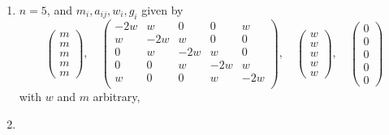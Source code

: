 \begin{lemma}
\begin{enumerate}
$$\begin{matrix}
m \\
m \\
2m
\end{matrix}
\right),
\quad
\left(
\begin{matrix}
-4w & 2w & 2w & 2w \\
2w & -4w & 0 & 0 \\
2w & 0 & -4w & 0 \\
2w & 0 & 0 & -2w
\end{matrix}
\right),
\quad
\left(
\begin{matrix}
2w \\
2w \\
2w \\
w
\end{matrix}
\right),
\quad
\left(
\begin{matrix}
0 \\
0 \\
0 \\
0
\end{matrix}
\right)
$$
with $w$ and $m$ arbitrary,
\item
\label{models-item-five-cycle}
$n = 5$, and $m_i, a_{ij}, w_i, g_i$ given by
$$
\left(
\begin{matrix}
m \\
m \\
m \\
m \\
m
\end{matrix}
\right),
\quad
\left(
\begin{matrix}
-2w & w & 0 & 0 & w \\
w & -2w & w & 0 & 0 \\
0 & w & -2w & w & 0 \\
0 & 0 & w & -2w & w \\
w & 0 & 0 & w & -2w \\
\end{matrix}
\right),
\quad
\left(
\begin{matrix}
w \\
w \\
w \\
w \\
w
\end{matrix}
\right),
\quad
\left(
\begin{matrix}
0 \\
0 \\
0 \\
0 \\
0
\end{matrix}
\right)
$$
with $w$ and $m$ arbitrary,
\item

\end{enumerate}
\end{lemma}
